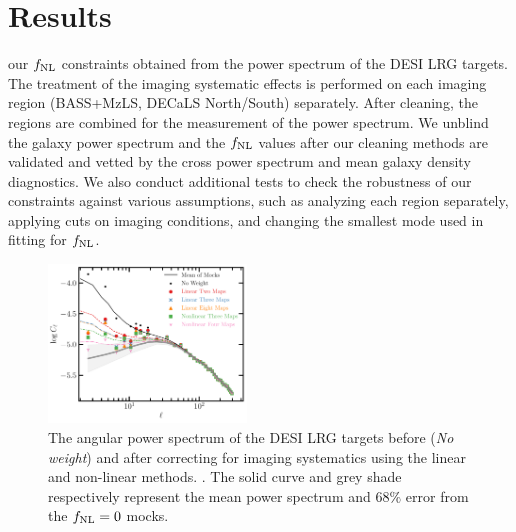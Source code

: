\section{Results}\label{sec:results}
 our $f_{\rm NL}$ constraints obtained from the power spectrum of the DESI LRG targets. The treatment of the imaging systematic effects is performed on each imaging region (BASS+MzLS, DECaLS North/South) separately. After cleaning, the regions are combined for the measurement of the power spectrum. We unblind the galaxy power spectrum and the $f_{\rm NL}$ values after our cleaning methods are validated and vetted by the cross power spectrum and mean galaxy density diagnostics. We also conduct additional tests to check the robustness of our constraints against various assumptions, such as analyzing each region separately, applying cuts on imaging conditions, and changing the smallest mode used in fitting for $f_{\rm NL}$. 


\begin{figure}
    \centering
    \includegraphics[width=0.47\textwidth]{figures/model_dr9.pdf} 
    \caption{  The angular power spectrum of the DESI LRG targets before (\textit{No weight}) and after correcting for imaging systematics using the linear and non-linear methods. . The solid curve and grey shade respectively represent the mean power spectrum and $68\%$ error from the $f_{\rm NL}=0$ mocks.}
    \label{fig:cl_dr9}
\end{figure}


